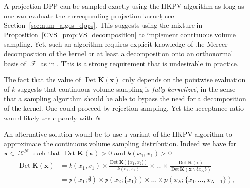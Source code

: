 \documentclass[twoside,11pt]{book}
\numberwithin{theorem}{chapter}
\numberwithin{definition}{chapter}
\numberwithin{proposition}{chapter}
\numberwithin{corollary}{chapter}
\numberwithin{example}{chapter}
\numberwithin{lemma}{chapter}
\numberwithin{assumption}{chapter}
\numberwithin{equation}{chapter}
\numberwithin{figure}{chapter}
\DeclareMathOperator{\Det}{Det}
\DeclareMathOperator*{\KDPP}{\mathfrak{K}}
\DeclareMathOperator{\F}{\mathcal{F}}
\DeclareMathOperator{\X}{\mathcal{X}}
\begin{document}



A projection DPP can be sampled exactly using the HKPV algorithm as long as one can evaluate the corresponding projection kernel; see Section~\ref{sec:num_algos_dpps}. 
This suggests using the mixture in Proposition~\ref{CVS_prop:VS_decomposition} to implement continuous volume sampling.
Yet, such an algorithm requires explicit knowledge of the Mercer decomposition of the kernel or at least a decomposition onto an orthonormal basis of $\F$ as in \parencite{KaSaTa19}. This is a strong requirement that is undesirable in practice.


The fact that the value of $\Det \bm{K}(\bm{x})$ only depends on the pointwise evaluation of $k$  suggests that continuous volume sampling is \emph{fully kernelized}, in the sense that a sampling algorithm should be able to bypass the need for a decomposition of the kernel.
One could proceed by rejection sampling. Yet the acceptance ratio would likely scale poorly with $N$.




An alternative solution would be to use a variant of the HKPV algorithm to approximate the continuous volume sampling distribution. Indeed we have for $\bm{x} \in \X^{N}$ such that $\Det \bm{K}(\bm{x})>0$ and $k(x_{1}, x_{1})>0$
\begin{align}
\Det \bm{K}(\bm{x}) & = k(x_{1},x_{1}) \times \frac{\Det \bm{K}( \{x_{1},x_{2} \})}{k(x_1,x_1)} \times \dots \times \frac{\Det \bm{K}( \bm{x})}{\Det \bm{K}( \bm{x} \smallsetminus \{x_{N} \})} \nonumber\\
& = p(x_{1}; \emptyset) \times p(x_{2}; \{x_{1}\}) \times \dots  \times p(x_{N}; \{x_{1}, \dots, x_{N-1}\}),
\end{align}
\end{document}
